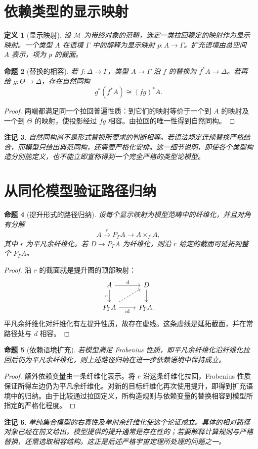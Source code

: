 \documentclass[12pt,oneside,openany,fontset=none]{ctexbook}
\theoremstyle{cn}
\newtheorem{definition}{定义}[chapter]
\newtheorem{proposition}[definition]{命题}
\newtheorem{remark}[definition]{注记}
\numberwithin{equation}{chapter}
\newcommand{\id}{\operatorname{id}}
\begin{document}
\section{依赖类型的显示映射}
\begin{definition}[显示映射]
设 $\mathcal M$ 为带终对象的范畴，选定一类拉回稳定的映射作为显示映射。一个类型 $A$ 在语境 $\Gamma$ 中的解释为显示映射 $p:A\to\Gamma$。扩充语境由总空间 $A$ 表示，项为 $p$ 的截面。
\end{definition}
\begin{proposition}[替换的相容]
若 $f:\Delta\to\Gamma$，类型 $A\to\Gamma$ 沿 $f$ 的替换为 $f^*A\to\Delta$。若再给 $g:\Theta\to\Delta$，存在自然同构
\[
g^*(f^*A)\cong(fg)^*A.
\]
\end{proposition}
\begin{proof}
两端都满足同一个拉回普遍性质：到它们的映射等价于一个到 $A$ 的映射及一个到 $\Theta$ 的映射，使投影经过 $fg$ 相容。由拉回的唯一性得到自然同构。
\end{proof}
\begin{remark}
自然同构尚不是形式替换所要求的判断相等。若语法规定连续替换严格结合，而模型只给出典范同构，还需要严格化安排。这一细节说明，即使各个类型构造分别能定义，也不能立即宣称得到一个完全严格的类型论模型。
\end{remark}

\section{从同伦模型验证路径归纳}
\begin{proposition}[提升形式的路径归纳]
设每个显示映射为模型范畴中的纤维化，并且对角有分解
\[
A\xrightarrow{r}P_\Gamma A\longrightarrow A\times_\Gamma A,
\]
其中 $r$ 为平凡余纤维化。若 $D\to P_\Gamma A$ 为纤维化，则沿 $r$ 给定的截面可延拓到整个 $P_\Gamma A$。
\end{proposition}
\begin{proof}
沿 $r$ 的截面就是提升图的顶部映射：
\[
\begin{tikzcd}
A\ar[r,"d"]\ar[d,"r"']&D\ar[d]\\
P_\Gamma A\ar[r,"\id"']\ar[ur,dashed]&P_\Gamma A.
\end{tikzcd}
\]
平凡余纤维化对纤维化有左提升性质，故存在虚线。这条虚线是延拓截面，并在常路径处与 $d$ 相容。
\end{proof}
\begin{proposition}[依赖语境扩充]
若模型满足 Frobenius 性质，即平凡余纤维化沿纤维化拉回后仍为平凡余纤维化，则上述路径归纳在进一步依赖语境中保持成立。
\end{proposition}
\begin{proof}
额外依赖变量由一条纤维化表示。将 $r$ 沿这条纤维化拉回，Frobenius 性质保证所得左边仍为平凡余纤维化。对新的目标纤维化再次使用提升，即得到扩充语境中的归纳。由于比较通过拉回定义，所构造规则与依赖变量的替换相容到模型所指定的严格化程度。
\end{proof}
\begin{remark}
单纯集合模型的右真性及单射余纤维化使这个论证成立。具体的相对路径对象已经在前文给出。模型提供的提升通常是存在性的；若要解释计算规则与严格替换，还需选取相容结构。这正是后述严格宇宙定理所处理的问题之一。
\end{remark}
\end{document}
